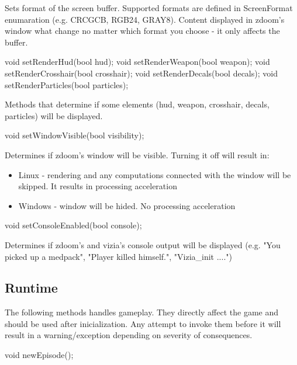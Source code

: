 Sets format of the screen buffer. Supported formats are defined in ScreenFormat enumaration (e.g. CRCGCB, RGB24, GRAY8). Content displayed in zdoom's window what change no matter which format you choose - it only affects the buffer.


\vspace{20pt}
\begin{clinee}       
void setRenderHud(bool hud);
void setRenderWeapon(bool weapon);
void setRenderCrosshair(bool crosshair);
void setRenderDecals(bool decals);
void setRenderParticles(bool particles);
\end{clinee}

Methods that determine if some elements (hud, weapon, crosshair, decals, particles) will be displayed.


\vspace{20pt}
\begin{clinee}
void setWindowVisible(bool visibility);
\end{clinee}

Determines if zdoom's window will be visible.
Turning it off will result in:
\begin{itemize}
\item Linux - rendering and any computations connected with the window will be skipped. It results in processing acceleration
\item Windows - window will be hided. No processing acceleration
\end{itemize}


\vspace{20pt}
\begin{clinee}
void setConsoleEnabled(bool console);
\end{clinee}

Determines if zdoom's and vizia's console output will be displayed (e.g. "You picked up a medpack", "Player killed himself.", "Vizia\_init ....")


\vspace{20pt}
\subsection{Runtime}
The following methods handles gameplay. They directly affect the game and should be used after inicialization. 
Any attempt to invoke them before it will result in a warning/exception depending on severity of consequences. 


\vspace{20pt}
\begin{clinee}
void newEpisode();
\end{clinee}

